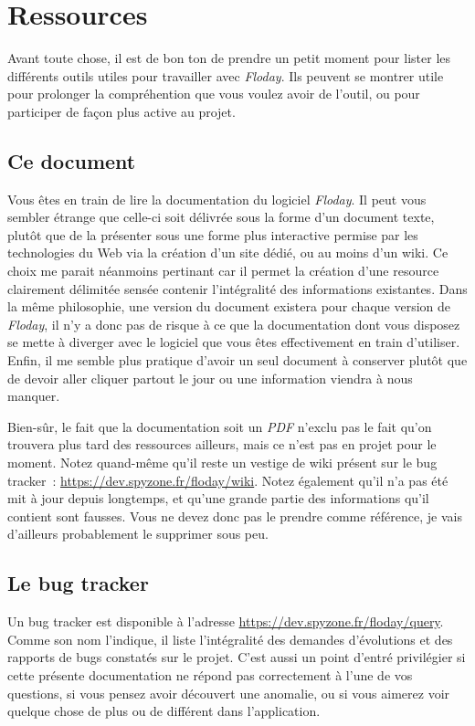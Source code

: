 \section{Ressources}
\begin{intro}
Avant toute chose, il est de bon ton de prendre un petit moment pour lister les différents outils utiles pour travailler avec \emph{Floday}.
Ils peuvent se montrer utile pour prolonger la compréhention que vous voulez avoir de l'outil, ou pour participer de façon plus active au projet.
\end{intro}

\subsection{Ce document}
Vous êtes en train de lire la documentation du logiciel \emph{Floday}.
Il peut vous sembler étrange que celle-ci soit délivrée sous la forme d'un document texte, plutôt que de la présenter sous une forme plus interactive permise par les technologies du Web via la création d'un site dédié, ou au moins d'un wiki.
Ce choix me parait néanmoins pertinant car il permet la création d'une resource clairement délimitée sensée contenir l'intégralité des informations existantes.
Dans la même philosophie, une version du document existera pour chaque version de \emph{Floday}, il n'y a donc pas de risque à ce que la documentation dont vous disposez se mette à diverger avec le logiciel que vous êtes effectivement en train d'utiliser.
Enfin, il me semble plus pratique d'avoir un seul document à conserver plutôt que de devoir aller cliquer partout le jour ou une information viendra à nous manquer.

Bien-sûr, le fait que la documentation soit un \emph{PDF} n'exclu pas le fait qu'on trouvera plus tard des ressources ailleurs, mais ce n'est pas en projet pour le moment.
Notez quand-même qu'il reste un vestige de wiki présent sur le bug tracker~: \url{https://dev.spyzone.fr/floday/wiki}.
Notez également qu'il n'a pas été mit à jour depuis longtemps, et qu'une grande partie des informations qu'il contient sont fausses.
Vous ne devez donc pas le prendre comme référence, je vais d'ailleurs probablement le supprimer sous peu.

\subsection{Le bug tracker}
Un bug tracker est disponible à l'adresse \url{https://dev.spyzone.fr/floday/query}.
Comme son nom l'indique, il liste l'intégralité des demandes d'évolutions et des rapports de bugs constatés sur le projet.
C'est aussi un point d'entré privilégier si cette présente documentation ne répond pas correctement à l'une de vos questions, si vous pensez avoir découvert une anomalie, ou si vous aimerez voir quelque chose de plus ou de différent dans l'application.


